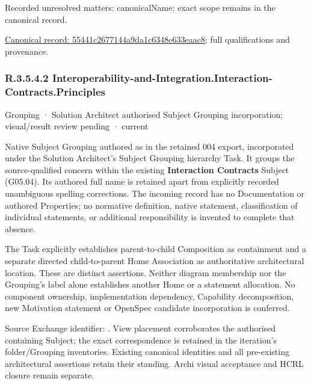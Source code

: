 {\small Recorded unresolved matters: canonicalName; exact scope remains in the canonical record.}\par
{\footnotesize \href{../../../../continuum/grouping/55441c2677144a9da1c6348e633eaac8.md}{Canonical record: 55441c2677144a9da1c6348e633eaac8}; full qualifications and provenance.}\par
\subsubsection*{R.3.5.4.2 Interoperability-and-Integration.Interaction-Contracts.Principles}
\label{navigation:R.3.5.4.2}

\label{element:d8d1f0aeff354b2696d3d6475c44c36e}
{\small Grouping · Solution Architect authorised Subject Grouping incorporation; visual/result review pending · current}\par

Native Subject Grouping authored as \texttt{} in the retained 004 export,
incorporated under the Solution Architect's Subject Grouping hierarchy Task.
It groups the source-qualified \texttt{} concern within
the existing \textbf{Interaction Contracts} Subject (G05.04). Its authored full name
is retained apart from explicitly recorded unambiguous spelling corrections.
The incoming record has no Documentation or authored Properties; no normative
definition, native statement, classification of individual statements, or
additional responsibility is invented to complete that absence.



The Task explicitly establishes parent-to-child Composition as containment and
a separate directed child-to-parent Home Association as authoritative architectural
location. These are distinct assertions. Neither diagram membership nor the
Grouping's label alone establishes another Home or a statement allocation.
No component ownership, implementation dependency, Capability decomposition,
new Motivation statement or OpenSpec candidate incorporation is conferred.



Source Exchange identifier: \texttt{}. View placement corroborates
the authorised containing Subject; the exact correspondence is retained in the
iteration's folder/Grouping inventories. Existing canonical identities and all
pre-existing architectural assertions retain their standing. Archi visual
acceptance and HCRL closure remain separate.


